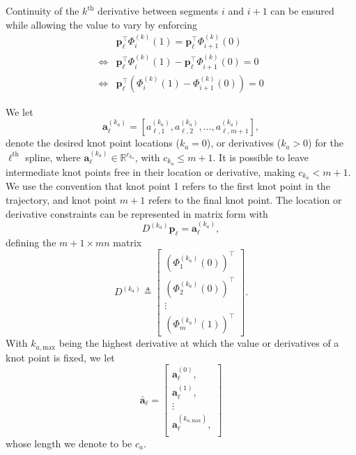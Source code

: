 	Continuity of the $k^\text{th}$ derivative between segments $i$ and $i+1$ can be ensured while allowing the value to vary by enforcing
	\begin{align}
		&\mathbf{p}_\ell^\top \Phi^{(k)}_i (1) = \mathbf{p}_\ell^\top \Phi^{(k)}_{i+1} (0)\\
		\Longleftrightarrow &\mathbf{p}_\ell^\top \Phi^{(k)}_i (1) - \mathbf{p}_\ell^\top \Phi^{(k)}_{i+1} (0) = 0\\
		\Longleftrightarrow &\mathbf{p}_\ell^\top (\Phi^{(k)}_i (1) - \Phi^{(k)}_{i+1} (0)) = 0
	\end{align}
\endproof

We let
\begin{equation}
\mathbf{a}_\ell^{(k_a)} = [a_{\ell,1}^{(k_a)}, a_{\ell,2}^{(k_a)}, \dots, a_{\ell,m+1}^{(k_a)}],
\end{equation}
denote the desired knot point locations ($k_a = 0$), or derivatives ($k_a > 0$) for the $\ell^\text{th}$ spline, 
where $\mathbf{a}_\ell^{(k_a)} \in \mathbb{R}^{c_{k_a}}$, with $c_{k_a} \leq m+1$.
It is possible to leave intermediate knot points free in their location or derivative, making $c_{k_a} < m+1$.
We use the convention that knot point 1 refers to the first knot point in the trajectory, 
and knot point $m+1$ refers to the final knot point.
The location or derivative constraints can be represented in matrix form with
\begin{equation}
	D^{(k_a)} \mathbf{p}_\ell = \mathbf{a}^{(k_a)}_\ell,
\end{equation}
defining the $m+1 \times mn$ matrix
\begin{equation}
	D^{(k_a)} \triangleq \begin{bmatrix}
		(\Phi^{(k_a)}_1(0))^\top \\
		(\Phi^{(k_a)}_2(0))^\top \\
		\vdots\\
		(\Phi^{(k_a)}_m(1))^\top 
	\end{bmatrix}.
\end{equation}
With $k_{a,\text{max}}$ being the highest derivative at which the value or derivatives of a knot point
is fixed, we let
\begin{equation}
	\bar{\mathbf{a}}_\ell = \begin{bmatrix}
		\mathbf{a}^{(0)}_\ell, \\
		\mathbf{a}^{(1)}_\ell, \\
		\vdots \\
		\mathbf{a}^{(k_{a,\text{max}})}_\ell, \\
	\end{bmatrix}
\end{equation}
whose length we denote to be $c_a$.


